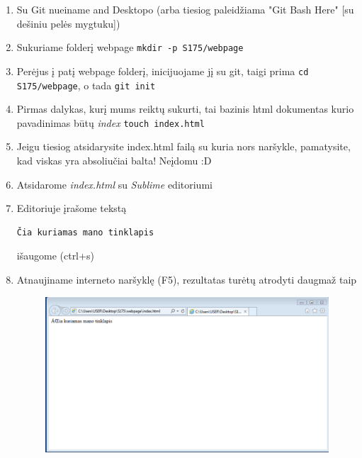 \documentclass[11pt,a4paper]{article}
\begin{document}
\begin{enumerate}
\item Su Git nueiname and Desktopo (arba tiesiog paleidžiama "Git Bash Here" [su dešiniu pelės mygtuku])
\item Sukuriame folderį webpage \colorbox{listinggray}{\lstinline|mkdir -p S175/webpage|}
\item Perėjus į patį webpage folderį, inicijuojame jį su git, taigi prima \colorbox{listinggray}{\lstinline|cd S175/webpage|}, o tada \colorbox{listinggray}{\lstinline|git init|}
\item Pirmas dalykas, kurį mums reiktų sukurti, tai bazinis html dokumentas kurio pavadinimas būtų \textit{index} \colorbox{listinggray}{\lstinline|touch index.html|}
\item Jeigu tiesiog atsidarysite index.html failą su kuria nors naršykle, pamatysite, kad viskas yra absoliučiai balta! Neįdomu :D
\item Atsidarome \textit{index.html} su \textit{Sublime} editoriumi
\item Editoriuje įrašome tekstą
\begin{lstlisting}
Čia kuriamas mano tinklapis
\end{lstlisting}
išaugome (ctrl+s)
\item Atnaujiname interneto naršyklę (F5), rezultatas turėtų atrodyti daugmaž taip

\begin{figure}[ht]
\center
\includegraphics[scale=0.3]{webpage_1.png}
\end{figure}


\end{enumerate}
\end{document}
